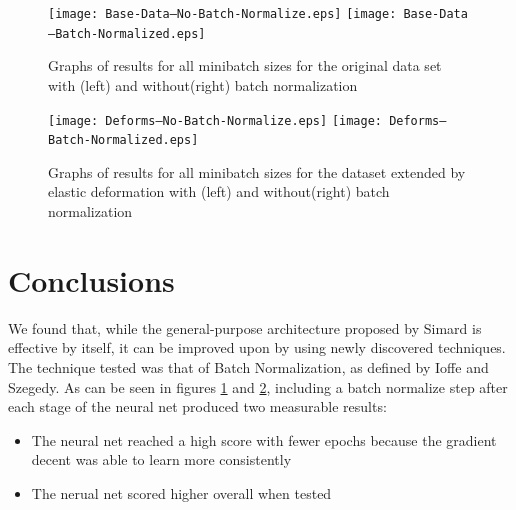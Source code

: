 \documentclass{article}
\begin{document}
\begin{figure}
  \centering
  \texttt{[image: Base-Data---No-Batch-Normalize.eps]}
  \texttt{[image: Base-Data---Batch-Normalized.eps]}
  
  \caption{Graphs of results for all minibatch sizes for the original data set with (left) and without(right) batch normalization}
  \label{fig:base-compare}
\end{figure}

\begin{figure}
  \centering
  \texttt{[image: Deforms---No-Batch-Normalize.eps]}
  \texttt{[image: Deforms---Batch-Normalized.eps]}

  \caption{Graphs of results for all minibatch sizes for the dataset extended by elastic deformation with (left) and without(right) batch normalization}
  \label{fig:deform-compare}
\end{figure}

\section{Conclusions}
We found that, while the general-purpose architecture proposed by Simard is effective by itself, it can be improved upon by using newly discovered techniques. The technique tested was that of Batch Normalization, as defined by Ioffe and Szegedy. As can be seen in figures \ref{fig:base-compare} and \ref{fig:deform-compare}, including a batch normalize step after each stage of the neural net produced two measurable results:
\begin{itemize}
  \item The neural net reached a high score with fewer epochs because the gradient decent was able to learn more consistently
  \item The nerual net scored higher overall when tested
\end{itemize}
\end{document}
